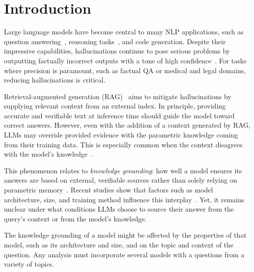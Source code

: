 \section{Introduction}

Large language models have become central to many NLP applications, such as question answering~\cite{gpt3,how_can_we_know}, reasoning tasks~\cite{treeofthoughts}, and code generation\cite{alphacode_generation}.
Despite their impressive capabilities, hallucinations continue to pose serious problems by outputting factually incorrect outputs with a tone of high confidence~\cite{how_can_we_know}.
For tasks where precision is paramount, such as factual QA or medical and legal domains, reducing hallucinations is critical\cite{mitigating_hallucinations}.

Retrieval-augmented generation (RAG)~\cite{rag} aims to mitigate hallucinations by supplying relevant context from an external index.
In principle, providing accurate and verifiable text at inference time should guide the model toward correct answers.
However, even with the addition of a context generated by RAG, LLMs may override provided evidence with the parametric knowledge coming from their training data.
This is especially common when the context disagrees with the model's knowledge~\cite{factual_recall,ragged}.

This phenomenon relates to \emph{knowledge grounding}: how well a model ensures its answers are based on external, verifiable sources rather than solely relying on parametric memory~\cite{rag}.
Recent studies show that factors such as model architecture, size, and training method influence this interplay~\cite{factual_recall,flant5,llama}.
Yet, it remains unclear under what conditions LLMs choose to source their answer from the query's context or from the model's knowledge.

The knowledge grounding of a model might be affected by the properties of that model, such as its architecture and size, and on the topic and context of the question.
Any analysis must incorporate several models with a questions from a variety of topics.

